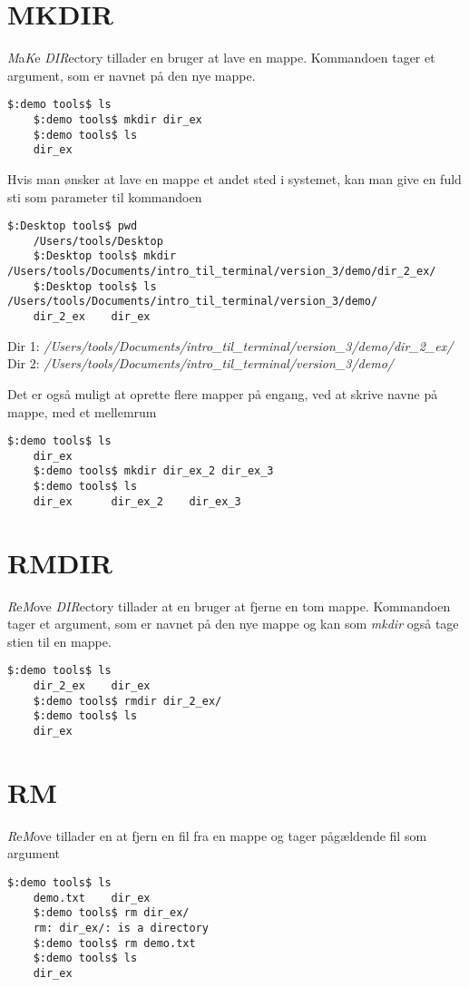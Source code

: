 \section{MKDIR}
\emph{M}a\emph{K}e \emph{DIR}ectory tillader en bruger at lave en mappe. Kommandoen tager et argument, som er navnet på den nye mappe.
\begin{lstlisting}[title=mkdir eksempel]
	$:demo tools$ ls
	$:demo tools$ mkdir dir_ex
	$:demo tools$ ls
	dir_ex
\end{lstlisting}
Hvis man ønsker at lave en mappe et andet sted i systemet, kan man give en fuld sti som parameter til kommandoen
\begin{lstlisting}[title=mkdir med sti eksempel]
	$:Desktop tools$ pwd
	/Users/tools/Desktop
	$:Desktop tools$ mkdir /Users/tools/Documents/intro_til_terminal/version_3/demo/dir_2_ex/
	$:Desktop tools$ ls /Users/tools/Documents/intro_til_terminal/version_3/demo/
	dir_2_ex	dir_ex
\end{lstlisting}
Dir 1: \textit{/Users/tools/Documents/intro\_til\_terminal/version\_3/demo/dir\_2\_ex/} \\
Dir 2: \textit{/Users/tools/Documents/intro\_til\_terminal/version\_3/demo/} \par
Det er også muligt at oprette flere mapper på engang, ved at skrive navne på mappe, med et mellemrum 
\begin{lstlisting}[title=mkdir med flere mapper eksempel]
	$:demo tools$ ls
	dir_ex
	$:demo tools$ mkdir dir_ex_2 dir_ex_3
	$:demo tools$ ls
	dir_ex		dir_ex_2	dir_ex_3
\end{lstlisting}


\section{RMDIR}
\emph{R}e\emph{M}ove \emph{DIR}ectory tillader at en bruger at fjerne en tom mappe. Kommandoen tager et argument, som er navnet på den nye mappe og kan som \textit{mkdir} også tage stien til en mappe.
\begin{lstlisting}[title=rmdir eksempel]	
	$:demo tools$ ls
	dir_2_ex	dir_ex
	$:demo tools$ rmdir dir_2_ex/
	$:demo tools$ ls
	dir_ex
\end{lstlisting}
\section{RM}
\emph{R}e\emph{M}ove tillader en at fjern en fil fra en mappe og tager pågældende fil som argument
\begin{lstlisting}[title=rmdir eksempel]	
	$:demo tools$ ls
	demo.txt	dir_ex
	$:demo tools$ rm dir_ex/
	rm: dir_ex/: is a directory
	$:demo tools$ rm demo.txt 
	$:demo tools$ ls
	dir_ex
\end{lstlisting}

